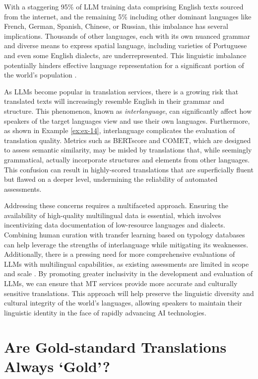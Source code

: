 With a staggering 95\% of LLM training data comprising English texts sourced from the internet, and the remaining 5\% including other dominant languages like French, German, Spanish, Chinese, or Russian, this imbalance has several implications. Thousands of other languages, each with its own nuanced grammar and diverse means to express spatial language, including varieties of Portuguese and even some English dialects, are underrepresented. This linguistic imbalance potentially hinders effective language representation for a significant portion of the world's population \parencite{brookings_language_gaps}.

As LLMs become popular in translation services, there is a growing risk that translated texts will increasingly resemble English in their grammar and structure. This phenomenon, known as \emph{interlanguage}, can significantly affect how speakers of the target languages view and use their own languages. Furthermore, as shown in Example \ref{ex:ex-14}, interlanguage complicates the evaluation of translation quality. Metrics such as BERTscore and COMET, which are designed to assess semantic similarity, may be misled by translations that, while seemingly grammatical, actually incorporate structures and elements from other languages. This confusion can result in highly-scored translations that are superficially fluent but flawed on a deeper level, undermining the reliability of automated assessments.

Addressing these concerns requires a multifaceted approach. Ensuring the availability of high-quality multilingual data is essential, which involves incentivizing data documentation of low-resource languages and dialects. Combining human curation with transfer learning based on typology databases can help leverage the strengths of interlanguage while mitigating its weaknesses. Additionally, there is a pressing need for more comprehensive evaluations of LLMs with multilingual capabilities, as existing assessments are limited in scope and scale \parencite{lai2023chatgpt}. By promoting greater inclusivity in the development and evaluation of LLMs, we can ensure that MT services provide more accurate and culturally sensitive translations. This approach will help preserve the linguistic diversity and cultural integrity of the world's languages, allowing speakers to maintain their linguistic identity in the face of rapidly advancing AI technologies.


\section{Are Gold-standard Translations Always `Gold'?} 

